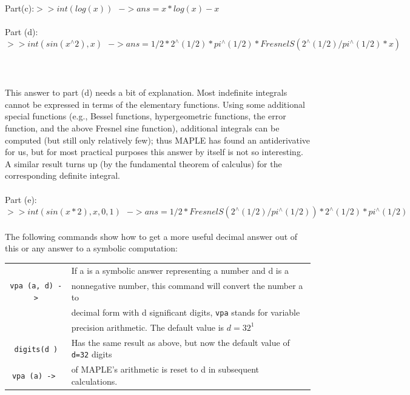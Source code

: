 \documentclass[../main.tex]{subfiles}
\begin{document}
\\
Part(c):\texttt{$>> int (log (x))~~~ -> ans=x*log(x)-x$}
\\
\\
Part (d):\texttt{$>> int (sin (x^{\wedge}2), x)~~~ -> ans= 1/2*2^{\wedge}
(1/2)*pi^{\wedge}
(1/2)*FresnelS(2^{\wedge}
(1/2)/pi^{\wedge}
(1/2)*x) $ }
\\
\\
\\
This answer to part (d) needs a bit of explanation. Most indefinite integrals 
cannot be expressed in terms of the elementary functions. Using some additional 
special functions (e.g., Bessel functions, hypergeometric functions, the error 
function, and the above Fresnel sine function), additional integrals can be 
computed (but still only relatively few); thus MAPLE has found an antiderivative 
for us, but for most practical purposes this answer by itself is not so interesting. A 
similar result turns up (by the fundamental theorem of calculus) for the 
corresponding definite integral. 
\\
\\
Part (e):\texttt{$>> int (sin (x*2), x, 0, 1)~~~ -> ans=1/2*FresnelS(2^{\wedge}
(1/2)/pi^{\wedge}
(1/2))*2^{\wedge}
(1/2)*pi^{\wedge}
(1/2)$} 
\\
\\
The following commands show how to get a more useful decimal answer out of 
this or any answer to a symbolic computation: 
\begin{center}
\begin{tabular}{|c|l|}
\hline
&If a is a symbolic answer representing a number and d is a\\
\texttt{vpa (a, d) ->}&nonnegative number, this command will convert the number a to \\
&decimal form with d significant digits, \texttt{vpa} stands for variable\\
&precision arithmetic. The default value is \texttt{$d=32^{1}$} \\
\hline
\texttt{digits(d )}&Has the same result as above, but now the default value of \texttt{d=32} digits\\
\texttt{vpa (a) -> }&of MAPLE's arithmetic is reset to d in subsequent calculations. \\
\hline
\end{tabular}
\end{center}
\end{document}
